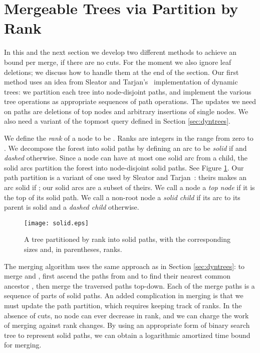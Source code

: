 \documentclass[twoside,leqno,twocolumn]{article}
\begin{document}
\section{Mergeable Trees via Partition by Rank}
\label{sec:part-rank}


In this and the next section we develop two different methods to achieve an  bound per merge, if there are no cuts.  For the moment we also ignore leaf deletions; we discuss how to handle them at the end of the section.  Our first method uses an idea from Sleator and Tarjan's~\cite{ST83, ST85} implementation of dynamic trees: we partition each tree into node-disjoint paths, and implement the various tree operations as appropriate sequences of path operations.  The updates we need on paths are deletions of top nodes and arbitrary insertions of single nodes.  We also need a variant of the topmost query defined in Section \ref{sec:dyntrees}.

We define the \emph{rank} of a node  to be .  Ranks are integers in the range from zero to .  We
decompose the forest into solid paths by defining an arc  to be \emph{solid} if  and \emph{dashed} otherwise. Since a node can have at most one solid arc from a child, the solid arcs partition the forest into node-disjoint solid paths. See Figure \ref{fig:solid}.  Our path partition is a variant of one used by Sleator and Tarjan~\cite{ST83}: theirs makes an arc  solid if ;  our solid arcs are a subset of theirs. We call a node a \emph{top node} if it is the top of its solid path. We call a non-root node a \emph{solid child} if its arc to its parent is solid and a \emph{dashed child} otherwise.



\begin{figure} [htb]
\addtolength{\abovecaptionskip}{-.5cm}
\begin{center}
\resizebox{0.5\textwidth}{!} {\texttt{[image: solid.eps]}}
\end{center}
\caption{\label{fig:solid} A tree partitioned by rank into solid
paths, with the corresponding sizes and, in parentheses, ranks.}
\end{figure}



The merging algorithm uses the same approach as in Section \ref{sec:dyntrees}: to merge  and , first ascend the paths from  and  to find their nearest common ancestor , then merge the traversed paths top-down. Each of the merge paths is a sequence of parts of solid paths.  An added complication in merging is that we must update the path partition, which requires keeping track of ranks.  In the absence of cuts, no node can ever decrease in rank, and we can charge the work of merging against rank changes.  By using an appropriate form of binary search tree to represent solid paths, we can obtain a logarithmic amortized time bound for merging.
\end{document}
